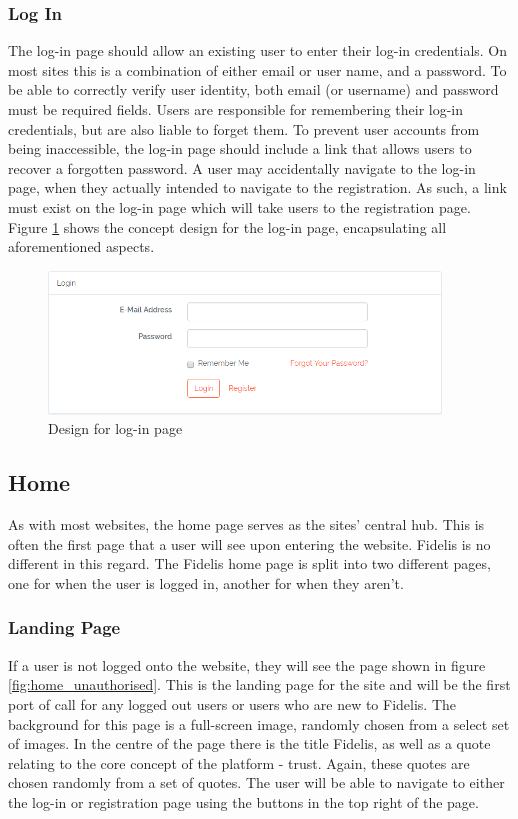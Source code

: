 \subsubsection{Log In}
The log-in page should allow an existing user to enter their log-in credentials. On most sites this is a combination of either email or user name, and a password. To be able to correctly verify user identity, both email (or username) and password must be required fields. Users are responsible for remembering their log-in credentials, but are also liable to forget them. To prevent user accounts from being inaccessible, the log-in page should include a link that allows users to recover a forgotten password. A user may accidentally navigate to the log-in page, when they actually intended to navigate to the registration. As such, a link must exist on the log-in page which will take users to the registration page. Figure \ref{fig:login-page} shows the concept design for the log-in page, encapsulating all aforementioned aspects.

\begin{figure}[H]
\centering
\includegraphics[height=1.5in]{Images/Design/login-page}
\caption{Design for log-in page}
\label{fig:login-page}
\end{figure}

\subsection{Home}
As with most websites, the home page serves as the sites' central hub. This is often the first page that a user will see upon entering the website. Fidelis is no different in this regard. The Fidelis home page is split into two different pages, one for when the user is logged in, another for when they aren't.

\subsubsection{Landing Page}
If a user is not logged onto the website, they will see the page shown in figure \ref{fig:home_unauthorised}. This is the landing page for the site and will be the first port of call for any logged out users or users who are new to Fidelis. The background for this page is a full-screen image, randomly chosen from a select set of images. In the centre of the page there is the title Fidelis, as well as a quote relating to the core concept of the platform - trust. Again, these quotes are chosen randomly from a set of quotes. The user will be able to navigate to either the log-in or registration page using the buttons in the top right of the page.

